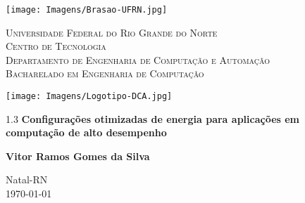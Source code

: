 
\begin{titlepage}
	\begin{center}
		
		\begin{minipage}{2cm}
			\begin{center}
				\texttt{[image: Imagens/Brasao-UFRN.jpg]}
			\end{center}
		\end{minipage}
		\begin{minipage}{11cm}
			\begin{center}
				\begin{espacosimples}
					{\small \textsc{Universidade Federal do Rio Grande do Norte}			\\
							  \textsc{Centro de Tecnologia}						\\
							  \textsc{Departamento de Engenharia de Computação e Automação}	\\
							  \textsc{Bacharelado em Engenharia de Computação}}
				\end{espacosimples}
			\end{center}
		\end{minipage}
		\begin{minipage}{2cm}
			\begin{center}
				\texttt{[image: Imagens/Logotipo-DCA.jpg]}
			\end{center}
		\end{minipage}
			
		\vspace{6cm}
						
		{\setlength{\baselineskip}%
		{1.3\baselineskip}
		{\LARGE \textbf{Configurações otimizadas de energia para aplicações em computação de alto desempenho}}\par}
			
		\vspace{4cm}
			
		{\large \textbf{Vitor Ramos Gomes da Silva}}
						
		\vspace{7cm}
		
		Natal-RN\\ \today%
	\end{center}
\end{titlepage}